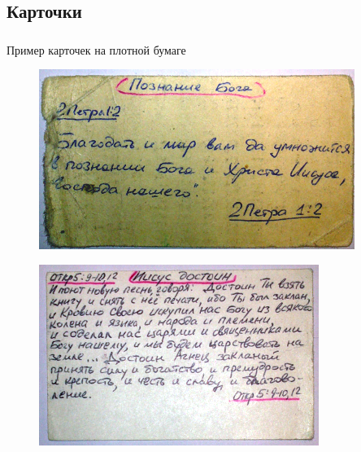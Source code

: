 \documentclass[t,aspectratio=169]{beamer}  %
\begin{document}
\subsection{Карточки}
\begin{frame}[c]
	\frametitle{\insertsection}
	\framesubtitle{\insertsubsection}
	Пример карточек на плотной бумаге
	 \begin{multicols*}{2}
		\begin{figure}
			\includegraphics[height=0.4\textheight]{card-2Pe_1.2}
		\end{figure}
		\begin{figure}
			\includegraphics[height=0.4\textheight]{card-Re}
		\end{figure}	
	 \end{multicols*}
\end{frame}
	 
\end{document}
